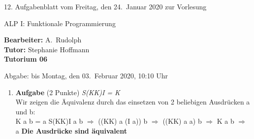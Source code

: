\documentclass[11pt]{article}
\newcommand{\VORLESUNG}{ALP I: Funktionale Programmierung}
\newcommand{\STAFF}{A.\ Rudolph}
\newcommand{\ASSIGNMENT}{12}
\newcommand{\HANDOUT}{Freitag, den 24.\ Januar   2020}
\newcommand{\TUTOR}{Stephanie Hoffmann}
\newcommand{\DELIVER}{bis Montag, den 03.\ Februar 2020, 10:10 Uhr}
\newcommand{\punkte}[1]{{\small{ }(#1 Punkte)}}
\newcommand{\aufgabe}[1]{\item{\bf #1}}
\begin{document}
\begin{center}
\ASSIGNMENT{}. Aufgabenblatt vom \HANDOUT{} zur Vorlesung 
\vspace*{0.5cm}

{\Large \VORLESUNG{}}

\textbf{Bearbeiter:} \STAFF{}\\
\textbf{Tutor:} \TUTOR\\
\textbf{Tutorium 06}
\vspace*{0.5cm}

{\small Abgabe: \DELIVER{}}
\vspace*{1cm}
\end{center}

\begin{enumerate}
\aufgabe{Aufgabe}\punkte{2}
\textit{S(KK)I = K}\\
Wir zeigen die Äquivalenz durch das einsetzen von 2 beliebigen Ausdrücken a und b:\\
K a b = a
\newline
S(KK)I a b
$\Rightarrow$ ((KK) a (I a)) b
$\Rightarrow$ ((KK) a a) b
$\Rightarrow$ K a b
$\Rightarrow$ a
\newline
\textbf{Die Ausdrücke sind äquivalent}


\end{enumerate}
\end{document}
